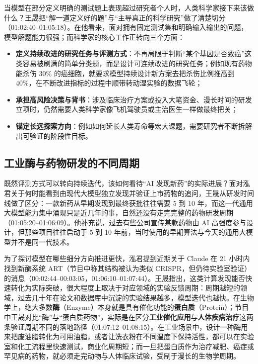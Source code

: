 \documentclass[UTF8,a4paper,11pt,fontset=fandol]{ctexart}
\begin{document}
当模型在部分定义明确的测试题上表现超过研究者个人时，人类科学家接下来该做什么？王晟把“解一道定义好的题”与“主导真正的科学研究”做了清楚切分（01:02:40–01:05:18）。在他看来，面对拥有固定测试集和明确输入输出的问题，模型解题能力很强；而科学家的核心工作正转向三个方面：
\begin{itemize}
\item \textbf{定义持续改进的研究任务与评测方式}：不再局限于判断“某个基因是否致癌”这类容易被刷满的简单分类题，而是设计可连续改进的研究任务；例如现有药物能杀伤 30\% 的癌细胞，就要求模型持续设计新方案去把杀伤比例推高到 40\%，在不断改进指标的过程中顺带转动湿实验的数据飞轮；
\item \textbf{承担高风险决策与背书}：涉及临床治疗方案或投入大笔资金、漫长时间的研发立项时，仍然需要人类科学家像飞机驾驶员或主治医生一样做最终把关；
\item \textbf{锚定长远探索方向}：例如如何延长人类寿命等宏大课题，需要研究者不断拆解出可验证的阶段性目标。
\end{itemize}

\subsection{工业酶与药物研发的不同周期}
既然评测方式可以转向持续迭代，该如何看待“AI 发现新药”的实际进展？面对泓君关于何时能看到由现代大模型独立发现并验证上市药物的追问，王晟从研发时间线做了区分：一款新药从早期发现到最终获批往往需要 5 到 10 年，而这一代通用大模型能力集中涌现只是近几年的事，自然还没有走完完整的药物研发周期（01:05:20–01:06:09）。他补充说，过去有些公司宣传某款药物由 AI 高强度参与设计，但那些项目往往启动于 5 到 10 年前，当时使用的早期算法与今天的通用大模型并不是同一代技术。

为了探讨模型在哪些细分方向推进更快，泓君提到近期关于 Claude 在 21 小时内找到新酶系统 ART（节目中称其结构被认为类似 CRISPR，但仍待实验室验证）的消息（00:02:44–00:03:05，01:06:10–01:07:44）。王晟指出，这类计算发现能否快速转化为实际突破，很大程度上取决于对应领域的实验反馈周期：周期越短的领域，过去几十年在论文和数据库中沉淀的实验结果越多，模型迭代也越快。在生物学上，绝大多数\textbf{酶}（Enzyme）本身就是具有催化功能的\textbf{蛋白质}（Protein）；节目中王晟对比“酶”与“蛋白质药物”，实际是在区分\textbf{工业催化应用}与\textbf{人体疾病治疗}这两条验证周期不同的落地路径（01:07:12–01:08:15）。在工业场景中，设计一种酶用来把废油脂转化为可用油脂，或者让洗衣粉在不同温度下保持活性，都可以在实验室和化工流程里快速测试，商业化周期短；而一旦把蛋白质作为治疗减肥、癌症或罕见病的药物，就必须走完动物与人体临床试验，受制于漫长的生物学周期。
\end{document}
